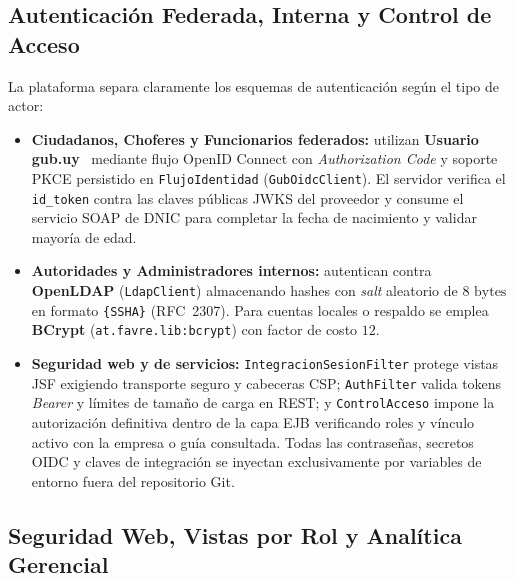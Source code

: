 \documentclass[11pt,a4paper,twocolumn]{article}
\begin{document}
\subsection{Autenticación Federada, Interna y Control de Acceso}

La plataforma separa claramente los esquemas de autenticación según el tipo de actor:
\begin{itemize}
    \item \textbf{Ciudadanos, Choferes y Funcionarios federados:} utilizan \textbf{Usuario gub.uy}~\cite{iduruguay} mediante flujo OpenID Connect con \textit{Authorization Code} y soporte PKCE persistido en \texttt{FlujoIdentidad} (\texttt{GubOidcClient}). El servidor verifica el \texttt{id\_token} contra las claves públicas JWKS del proveedor y consume el servicio SOAP de DNIC para completar la fecha de nacimiento y validar mayoría de edad.
    \item \textbf{Autoridades y Administradores internos:} autentican contra \textbf{OpenLDAP} (\texttt{LdapClient}) almacenando hashes con \textit{salt} aleatorio de $8\text{ bytes}$ en formato \texttt{\{SSHA\}} (RFC~2307). Para cuentas locales o respaldo se emplea \textbf{BCrypt} (\texttt{at.favre.lib:bcrypt}) con factor de costo $12$.
    \item \textbf{Seguridad web y de servicios:} \texttt{IntegracionSesionFilter} protege vistas JSF exigiendo transporte seguro y cabeceras CSP; \texttt{AuthFilter} valida tokens \textit{Bearer} y límites de tamaño de carga en REST; y \texttt{ControlAcceso} impone la autorización definitiva dentro de la capa EJB verificando roles y vínculo activo con la empresa o guía consultada. Todas las contraseñas, secretos OIDC y claves de integración se inyectan exclusivamente por variables de entorno fuera del repositorio Git.
\end{itemize}

\subsection{Seguridad Web, Vistas por Rol y Analítica Gerencial}
\end{document}
